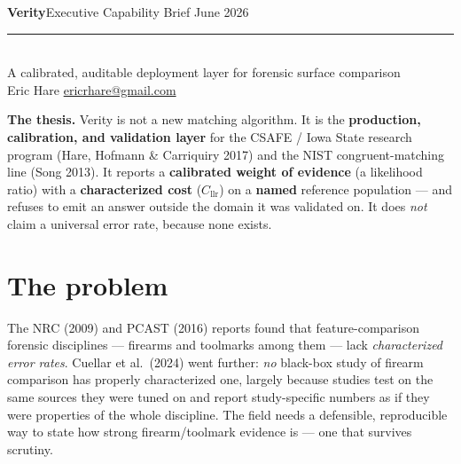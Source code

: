 \documentclass[10pt]{article}
\newcommand{\Cllr}{C_{\mathrm{llr}}}
\begin{document}
{\LARGE\bfseries Verity}\hfill{\color{vgray}\small Executive Capability Brief \;\textbar\; June 2026}\\[2pt]
{\color{vblue}\rule{\linewidth}{1.2pt}}\\[3pt]
{\large A calibrated, auditable deployment layer for forensic surface comparison}\\[2pt]
{\color{vgray}\small Eric Hare \;\textbar\; \href{mailto:ericrhare@gmail.com}{ericrhare@gmail.com}}

\vspace{4pt}
\begin{claimbox}
\textbf{The thesis.} Verity is not a new matching algorithm. It is the
\textbf{production, calibration, and validation layer} for the CSAFE / Iowa State
research program (Hare, Hofmann \& Carriquiry 2017) and the NIST congruent-matching
line (Song 2013). It reports a \textbf{calibrated weight of evidence} (a likelihood
ratio) with a \textbf{characterized cost} ($\Cllr$) on a \textbf{named} reference
population --- and refuses to emit an answer outside the domain it was validated on.
It does \emph{not} claim a universal error rate, because none exists.
\end{claimbox}

\vspace{2pt}
\section{The problem}
The NRC (2009) and PCAST (2016) reports found that feature-comparison forensic
disciplines --- firearms and toolmarks among them --- lack \emph{characterized error
rates}. Cuellar et al.\ (2024) went further: \emph{no} black-box study of firearm
comparison has properly characterized one, largely because studies test on the same
sources they were tuned on and report study-specific numbers as if they were
properties of the whole discipline. The field needs a defensible, reproducible way
to state how strong firearm/toolmark evidence is --- one that survives scrutiny.

\end{document}
